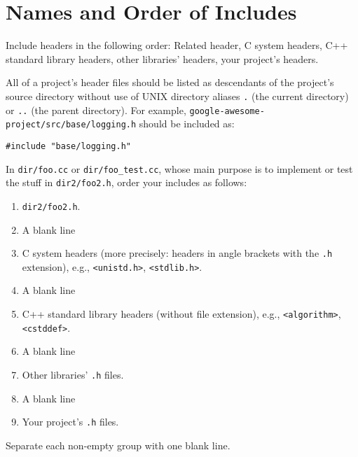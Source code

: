 
\section{Names and Order of Includes}\label{sec:names-and-order-of-includes}
Include headers in the following order: Related header, C system headers, C++ standard library headers, other libraries' headers, your project's headers.

All of a project's header files should be listed as descendants of the project's source directory without use of UNIX directory aliases \texttt{.} (the current directory) or \texttt{..} (the parent directory). For example, \texttt{google-awesome-project/src/base/logging.h} should be included as:
\begin{verbatim}
#include "base/logging.h"
\end{verbatim}
In \texttt{dir/foo.cc} or \texttt{dir/foo_test.cc}, whose main purpose is to implement or test the stuff in \texttt{dir2/foo2.h}, order your includes as follows:

\begin{enumerate}
    \item \texttt{dir2/foo2.h}.
    \item A blank line
    \item C system headers (more precisely: headers in angle brackets with the \texttt{.h} extension), e.g., \texttt{<unistd.h>}, \texttt{<stdlib.h>}.
    \item A blank line
    \item C++ standard library headers (without file extension), e.g., \texttt{<algorithm>}, \texttt{<cstddef>}.
    \item A blank line
    \item Other libraries' \texttt{.h} files.
    \item A blank line
    \item Your project's \texttt{.h} files.
\end{enumerate}
Separate each non-empty group with one blank line.


